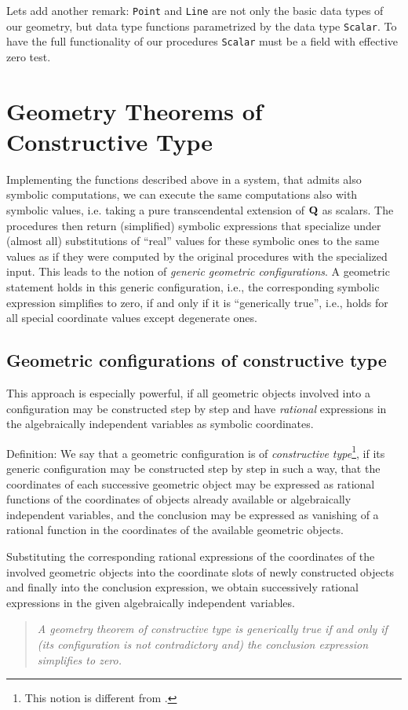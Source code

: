 \documentclass{article}
\begin{document}
Lets add another remark: {\tt Point} and {\tt Line} are not only the
basic data types of our geometry, but data type functions parametrized
by the data type {\tt Scalar}. To have the full functionality of our
procedures {\tt Scalar} must be a field with effective zero test.

\section{Geometry Theorems of Constructive Type}

Implementing the functions described above in a system, that admits
also symbolic computations, we can execute the same computations also
with symbolic values, i.e. taking a pure transcendental extension of
${\bf Q}$ as scalars. The procedures then return (simplified) symbolic
expressions that specialize under (almost all) substitutions of
``real'' values for these symbolic ones to the same values as if they
were computed by the original procedures with the specialized input.
This leads to the notion of {\em generic geometric configurations}. A
geometric statement holds in this generic configuration, i.e., the
corresponding symbolic expression simplifies to zero, if and only if
it is ``generically true'', i.e., holds for all special coordinate
values except degenerate ones.

\subsection{Geometric configurations of constructive type}

This approach is especially powerful, if all geometric objects
involved into a configuration may be constructed step by step and have
{\em rational} expressions in the algebraically independent variables
as symbolic coordinates.
\medskip

{\sc Definition: } We say that a geometric configuration is of {\em
constructive type}\footnote{This notion is different from
\cite{Chou:88}.}, if its generic configuration may be constructed step
by step in such a way, that the coordinates of each successive
geometric object may be expressed as rational functions of the
coordinates of objects already available or algebraically independent
variables, and the conclusion may be expressed as vanishing of a
rational function in the coordinates of the available geometric
objects.
\medskip

Substituting the corresponding rational expressions of the coordinates
of the involved geometric objects into the coordinate slots of newly
constructed objects and finally into the conclusion expression, we
obtain successively rational expressions in the given algebraically
independent variables.
\begin{quote}\it
A geometry theorem of constructive type is generically true if and
only if (its configuration is not contradictory and) the conclusion
expression simplifies to zero.
\end{quote}
\end{document}
